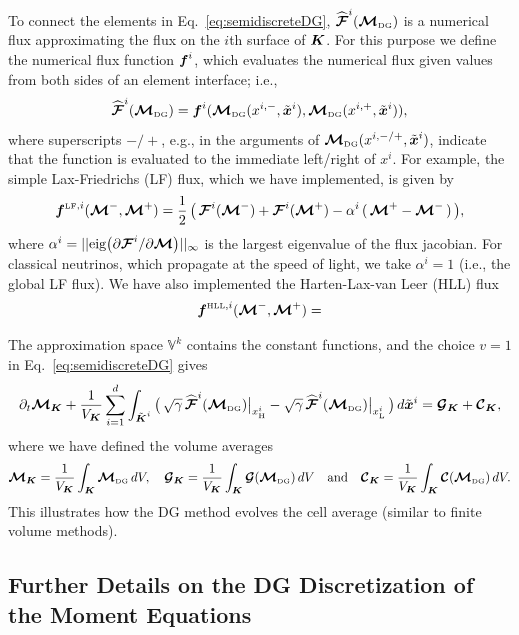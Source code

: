 \documentclass[10pt,preprint]{aastex}
\newcommand{\sumx}{\sum_{i=1}^{d}}
\begin{document}
To connect the elements in Eq.~\eqref{eq:semidiscreteDG}, $\widehat{\boldsymbol{\mathcal{F}}}^{i}(\boldsymbol{\mathcal{M}}_{\mbox{\tiny DG}})$ is a numerical flux approximating the flux on the $i$th surface of $\boldsymbol{K}$.  
For this purpose we define the numerical flux function $\boldsymbol{f}^{i}$, which evaluates the numerical flux given values from both sides of an element interface; i.e.,
\begin{equation}
  \widehat{\boldsymbol{\mathcal{F}}}^{i}(\boldsymbol{\mathcal{M}}_{\mbox{\tiny DG}})=\boldsymbol{f}^{i}(\boldsymbol{\mathcal{M}}_{\mbox{\tiny DG}}(x^{i,-},\tilde{\boldsymbol{x}}^{i}),\boldsymbol{\mathcal{M}}_{\mbox{\tiny DG}}(x^{i,+},\tilde{\boldsymbol{x}}^{i})),
\end{equation}
where superscripts $-/+$, e.g., in the arguments of $\boldsymbol{\mathcal{M}}_{\mbox{\tiny DG}}(x^{i,-/+},\tilde{\boldsymbol{x}}^{i})$, indicate that the function is evaluated to the immediate left/right of $x^{i}$.  
For example, the simple Lax-Friedrichs (LF) flux, which we have implemented, is given by
\begin{equation}
  \boldsymbol{f}^{\mbox{\tiny LF},i}(\boldsymbol{\mathcal{M}}^{-},\boldsymbol{\mathcal{M}}^{+})
  =\frac{1}{2}\,\big(\,\boldsymbol{\mathcal{F}}^{i}(\boldsymbol{\mathcal{M}}^{-})+\boldsymbol{\mathcal{F}}^{i}(\boldsymbol{\mathcal{M}}^{+})-\alpha^{i}\,(\,\boldsymbol{\mathcal{M}}^{+}-\boldsymbol{\mathcal{M}}^{-}\,)\,\big),
\end{equation}
where $\alpha^{i}=||\mbox{eig}\big(\partial\boldsymbol{\mathcal{F}}^{i}/\partial\boldsymbol{\mathcal{M}}\big)||_{\infty}$ is the largest eigenvalue of the flux jacobian.  
For classical neutrinos, which propagate at the speed of light, we take $\alpha^{i}=1$ (i.e., the global LF flux).  
We have also implemented the Harten-Lax-van Leer (HLL) flux
\begin{equation}
  \boldsymbol{f}^{\mbox{\tiny HLL},i}(\boldsymbol{\mathcal{M}}^{-},\boldsymbol{\mathcal{M}}^{+})
  =
\end{equation}

The approximation space $\mathbb{V}^{k}$ contains the constant functions, and the choice $v=1$ in Eq.~\eqref{eq:semidiscreteDG} gives
\begin{equation}
  \partial_{t}\bcM_{\bK}
  +\f{1}{V_{\bK}}\sumx\int_{\tilde{\bK}^{i}}
  \big(\,\sqrt{\gamma}\,\widehat{\bcF}^{i}(\bcM_{\DG})\big|_{\xH^{i}}-\sqrt{\gamma}\,\widehat{\bcF}^{i}(\bcM_{\DG})\big|_{\xL^{i}}\,\big)\,d\tilde{\bx}^{i}
  =\bcG_{\bK}+\bcC_{\bK},
\end{equation}
where we have defined the volume averages
\begin{equation}
  \boldsymbol{\mathcal{M}}_{\boldsymbol{K}}=\frac{1}{V_{\boldsymbol{K}}}\int_{\boldsymbol{K}}\boldsymbol{\mathcal{M}}_{\mbox{\tiny DG}}\,dV, \quad
  \boldsymbol{\mathcal{G}}_{\boldsymbol{K}}=\frac{1}{V_{\boldsymbol{K}}}\int_{\boldsymbol{K}}\boldsymbol{\mathcal{G}}(\boldsymbol{\mathcal{M}}_{\mbox{\tiny DG}})\,dV  \quad\text{and}\quad
  \boldsymbol{\mathcal{C}}_{\boldsymbol{K}}=\frac{1}{V_{\boldsymbol{K}}}\int_{\boldsymbol{K}}\boldsymbol{\mathcal{C}}(\boldsymbol{\mathcal{M}}_{\mbox{\tiny DG}})\,dV.
\end{equation}
This illustrates how the DG method evolves the cell average (similar to finite volume methods).  

\subsection{Further Details on the DG Discretization of the Moment Equations}
\end{document}
